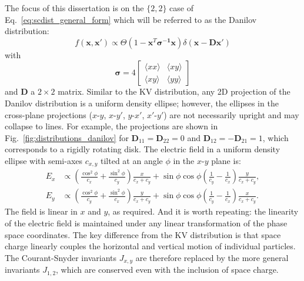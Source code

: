 The focus of this dissertation is on the $\{2, 2\}$ case of Eq.~\eqref{eq:scdist_general_form} which will be referred to as the Danilov distribution:
%
\begin{equation}
    f(\mathbf{x}, \mathbf{x}') \propto 
    \Theta\left({1 - \mathbf{x}^T\bm{\mathbf{\sigma}^{-1}}\mathbf{x}}\right)
    \delta\left({\mathbf{x} - \mathbf{D}\mathbf{x}'}\right)
\end{equation}
%
with 
%
\begin{equation}
    \bm{\sigma} = 
    4
    \begin{bmatrix}
        \langle{xx}\rangle & \langle{xy}\rangle \\
        \langle{xy}\rangle & \langle{yy}\rangle
    \end{bmatrix}
\end{equation}
%
and $\mathbf{D}$ a $2 \times 2$ matrix. Similar to the KV distribution, any 2D projection of the Danilov distribution is a uniform density ellipse; however, the ellipses in the cross-plane projections ($x$-$y$, $x$-$y'$, $y$-$x'$, $x'$-$y'$) are not necessarily upright and may collapse to lines. For example, the projections are shown in Fig.~\ref{fig:distributions_danilov} for $\mathbf{D}_{11}=\mathbf{D}_{22}=0$ and $\mathbf{D}_{12} = -\mathbf{D}_{21}=1$, which corresponds to a rigidly rotating disk. The electric field in a uniform density ellipse with semi-axes $c_{x,y}$ tilted at an angle $\phi$ in the $x$-$y$ plane is:
%
\begin{equation}
\begin{aligned}
    E_x &\propto 
    \left({\frac{\cos^2\phi}{c_x} + \frac{\sin^2\phi}{c_y}}\right) \frac{x}{c_x + c_y}
    +
    \sin\phi\cos\phi \left({\frac{1}{c_y} - \frac{1}{c_x}}\right) \frac{y}{c_x + c_y}, \\
    E_y &\propto 
    \left({\frac{\cos^2\phi}{c_y} + \frac{\sin^2\phi}{c_x}}\right) \frac{y}{c_x + c_y}
    +
    \sin\phi\cos\phi \left({\frac{1}{c_y} - \frac{1}{c_x} }\right) \frac{x}{c_x + c_y}.
\end{aligned}
\end{equation}
%
The field is linear in $x$ and $y$, as required. And it is worth repeating: the linearity of the electric field is maintained under any linear transformation of the phase space coordinates. The key difference from the KV distribution is that space charge linearly couples the horizontal and vertical motion of individual particles. The Courant-Snyder invariants $J_{x,y}$ are therefore replaced by the more general invariants $J_{1, 2}$, which are conserved even with the inclusion of space charge. 

